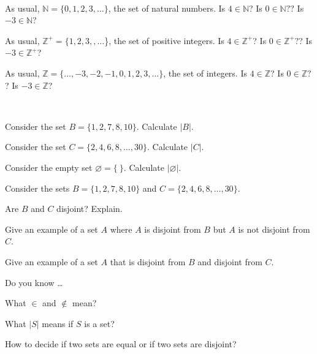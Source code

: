 \begin{exer}[\exerP] %
\label{exer_decide_element_infinite}  
~
    \begin{exerpart}
        \item As usual, $\mathbb{N} = \{0,1,2,3,\ldots\}$, the set of natural numbers.  Is $4 \in \mathbb{N}$? Is $0 \in \mathbb{N}?$? Is $-3 \in \mathbb{N}$?  
        \item As usual, $\mathbb{Z}^+ =\{1,2,3,, \ldots$\}, the set of positive integers. Is $4 \in \mathbb{Z}^+$? Is $0 \in \mathbb{Z}^+?$? Is $-3 \in \mathbb{Z}^+$? 
        \item As usual, $\mathbb{Z} = \{ \ldots, -3, -2, -1, 0, 1, 2,3, \ldots\}$, the set of integers.  Is $4 \in \mathbb{Z}$? Is $0 \in \mathbb{Z}?$? Is $-3 \in \mathbb{Z}$? 
    \end{exerpart}
\end{exer}

\begin{exer}[\exerP] %
\label{exer_set_cardinality}
~
    \begin{exerpart}
        \item Consider the set $B= \{1,2,7,8,10\}$. Calculate $|B|$.
        \item Consider the set $C = \{2,4,6,8,\ldots, 30\}$. Calculate $|C|$.
        \item Consider the empty set $\varnothing=\{ ~\}$. Calculate $|\varnothing|$. 
    \end{exerpart}
\end{exer}

\begin{exer}[\exerU] %
\label{exer_disjoint}
    Consider the sets $B= \{1,2,7,8,10\}$ and $C = \{2,4,6,8,\ldots, 30\}$.
    \begin{exerpart}
        \item  Are $B$ and $C$ disjoint?  Explain.
        \item Give an example of a set $A$ where $A$ is disjoint from $B$ but $A$ is not disjoint from $C$.
        \item Give an example of a set $A$ that is disjoint from $B$ and disjoint from $C$. 
    \end{exerpart}
\end{exer}

\begin{exer}[\exerR] %
\label{exer_dyk_elements}
    Do you know \ldots
        \begin{exerpart}
            \item What $\in$ and $\notin$ mean?
            \item What $|S|$ means if $S$ is a set?
            \item How to decide if two sets are equal or if two sets are disjoint?
        \end{exerpart}
\end{exer}

